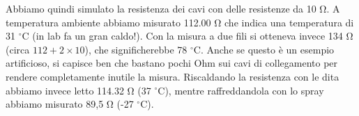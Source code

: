 Abbiamo quindi simulato la resistenza dei cavi con delle resistenze da 10 \si{\ohm}. A temperatura ambiente abbiamo misurato
112.00 \si{\ohm} che indica una temperatura di 31 $^\circ$C (in lab fa un gran caldo!). Con la misura a due fili si otteneva 
invece 134 \si{\ohm} (circa $112 + 2 \times 10$), che significherebbe 78 $^\circ$C. Anche se questo è un esempio artificioso,
si capisce ben che bastano pochi Ohm sui cavi di collegamento per rendere completamente inutile la misura. Riscaldando la resistenza con le dita abbiamo
invece letto 114.32 \si{\ohm} (37 $^\circ$C), mentre raffreddandola con lo spray abbiamo misurato 89,5 \si{\ohm} (-27 $^\circ$C).
